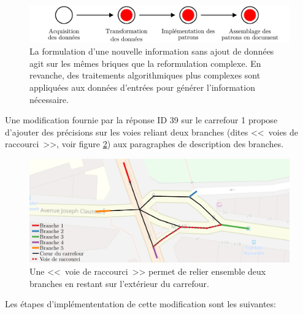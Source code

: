 \begin{figure}[ht]
    \centering
    \includegraphics[width=\textwidth]{images/evaluation/pipeline/pipeline_reformulation_complexe.pdf}
    \caption[Formulation d'une nouvelle information sans ajout de données dans la chaîne de description]{La formulation d'une nouvelle information sans ajout de données agit sur les mêmes briques que la reformulation complexe. En revanche, des traitements algorithmiques plus complexes sont appliquées aux données d'entrées pour générer l'information nécessaire.}
    \label{fig:evaluation_nouvelle_information_sans_ajout}
\end{figure}

\newpar{}

Une modification fournie par la réponse ID 39 sur le carrefour 1 propose d'ajouter des précisions sur les voies reliant deux branches (dites <<~voies de raccourci~>>, voir figure \ref{fig:evaluation_voie_de_raccourci}) aux paragraphes de description des branches.

\begin{figure}[ht]
    \centering
    \includegraphics[width=\textwidth]{images/evaluation/pipeline/voie_raccourci.pdf}
    \caption[Une <<~voie de raccourci~>> dans un carrefour]{Une <<~voie de raccourci~>> permet de relier ensemble deux branches en restant sur l'extérieur du carrefour.}
    \label{fig:evaluation_voie_de_raccourci}
\end{figure}

\newpar{}

Les étapes d'implémententation de cette modification sont les suivantes:

